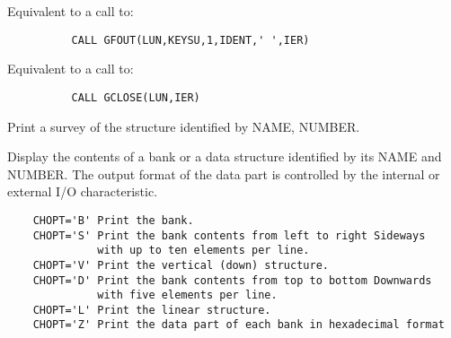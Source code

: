 \ENDCMD


\BEGARG
{}
\ENDARG

   \par
Equivalent to a call to:  
\begin{verbatim}
          CALL GFOUT(LUN,KEYSU,1,IDENT,' ',IER)
\end{verbatim}

\ENDCMD


\BEGARG
{}
\ENDARG

   \par
Equivalent to a call to:  
\begin{verbatim}
          CALL GCLOSE(LUN,IER)
\end{verbatim}

\ENDCMD
\newpage
{}
\ifMENUtext

\fi


\BEGARG
{}
\ENDARG

   \par
Print a survey of the structure identified by NAME, NUMBER.  

\ENDCMD


\BEGARG
{}
\ENDARG

   \par
Display the contents of a bank or a data structure identified by its NAME 
   and NUMBER.  The output format of the data part is controlled by the 
   internal or external I/O characteristic.  
\begin{verbatim}
    CHOPT='B' Print the bank.
    CHOPT='S' Print the bank contents from left to right Sideways
              with up to ten elements per line.
    CHOPT='V' Print the vertical (down) structure.
    CHOPT='D' Print the bank contents from top to bottom Downwards
              with five elements per line.
    CHOPT='L' Print the linear structure.
    CHOPT='Z' Print the data part of each bank in hexadecimal format
\end{verbatim}

